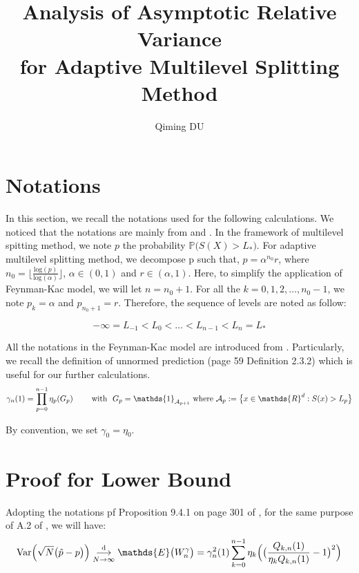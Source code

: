 \documentclass[a4paper,10pt]{article}
\title{Analysis of Asymptotic Relative Variance\\ for Adaptive Multilevel Splitting Method}
\author{Qiming DU}
\date{}
\begin{document}
\maketitle
\vspace{3cm}
\section{Notations}

In this section, we recall the notations used for the following calculations.
We noticed that the notations are mainly from \cite{cerou2014fluctuation} 
and \cite{cerou2012}. In the framework of multilevel spitting method, 
we note $p$ the probability $\mathds{P}\big(S(X) > L_*\big)$. 
For adaptive multilevel splitting method, we decompose p such that,
$ p = \alpha^{n_0}r$, where $n_0 = \big\lfloor \frac{\mathrm{log}(p)}{\mathrm{log}(\alpha)} \big\rfloor$, $\alpha \in (0,1)$ and $r \in (\alpha,1)$.
Here, to simplify the application of Feynman-Kac model, we will let $n = n_0 + 1$. For all the $k = 0,1,2,\dots,n_0-1$, we note $p_k = \alpha$ and $p_{n_0+1} = r$.
Therefore, the sequence of levels are noted as follow: 

$$ -\infty = L_{-1} < L_0 < \dots < L_{n-1} < L_n = L_*$$

All the notations in the Feynman-Kac model are introduced from \cite{del2004feynman}.
Particularly, we recall the definition of unnormed prediction (page 59 Definition 2.3.2)
\cite{del2004feynman} which is useful for our further calculations.
$$\gamma_n(1) = \prod_{p = 0 }^{n-1} \eta_p(G_p) \text{ \qquad with \ }
G_p = \mathds{1}_{\mathcal{A}_{p+1}} 
\ \text{where}\ \mathcal{A}_p := \big\{ x \in \mathds{R}^d : S(x) > L_p \big\}$$

By convention, we set $\gamma_0 = \eta_0$.

\section{Proof for Lower Bound}
Adopting the notations pf Proposition 9.4.1 on page 301 of \cite{del2004feynman}, for the same purpose of A.2 of \cite{cerou2012}, we will have:
\begin{equation*}
\mathrm{Var}\Big(\sqrt{N}\big(\hat p - p\big)\Big) 
\underset{N \to \infty}{\overset{\mathrm{d}}{\longrightarrow}}
 \mathds{E}\big(W_n^{\gamma}\big) \\ 
= \gamma_{n}^2(1) \sum_{k = 0}^{n-1} \eta_k\Big(\big(\frac{Q_{k,n}(1)}{\eta_k Q_{k,n}(1)} - 1\big)^2\Big)
\end{equation*}
\end{document}
